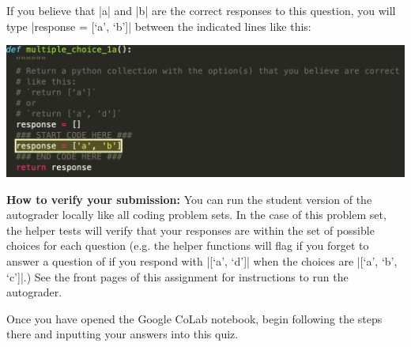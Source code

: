 If you believe that |a| and |b| are the correct responses to this question, you
will type |response = [`a', `b']| between the indicated lines like this:

\begin{center}
\includegraphics[width=1\textwidth]{sample_question_complete.png}
\end{center}

{\bf How to verify your submission:}
You can run the student version of the autograder locally like all coding
problem sets.  In the case of this problem set, the helper tests will verify
that your responses are within the set of possible choices for each question
(e.g. the helper functions will flag if you forget to answer a question of if
you respond with |[`a', `d']| when the choices are |[`a', `b', `c']|.)  See the
front pages of this assignment for instructions to run the autograder.
\clearpage

Once you have opened the Google CoLab notebook, begin following the steps there and inputting your answers into this quiz. 

